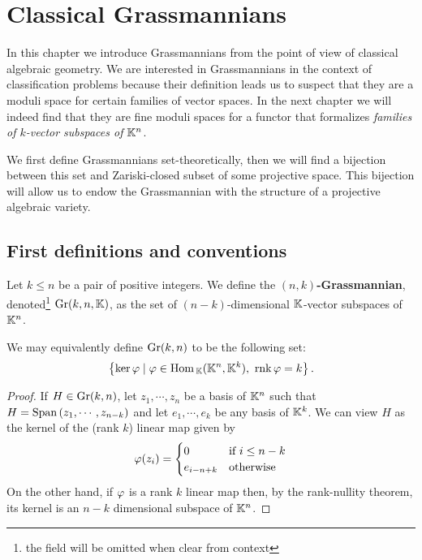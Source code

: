 \chapter{Classical Grassmannians}
In this chapter we introduce Grassmannians from the point of view of classical algebraic geometry. We are interested in Grassmannians in the context of classification problems because their definition leads us to suspect that they are a moduli space for certain families of vector spaces. In the next chapter we will indeed find that they are fine moduli spaces for a functor that formalizes \textit{families of $k$-vector subspaces of $\mathbb{K}^n$}.\medskip

We first define Grassmannians set-theoretically, then we will find a bijection between this set and Zariski-closed subset of some projective space. This bijection will allow us to endow the Grassmannian with the structure of a projective algebraic variety.

\section{First definitions and conventions}
\begin{definition}[Grassmannian]
Let $k\leq n$ be a pair of positive integers. We define the \textbf{$(n,k)$-Grassmannian}, denoted\footnote{the field will be omitted when clear from context} $\mathrm{Gr}(k,n,\mathbb{K})$, as the set of $(n-k)$-dimensional $\mathbb{K}$-vector subspaces of $\mathbb{K}^n$.
\end{definition}

\begin{remark}
We may equivalently define $\mathrm{Gr}(k,n)$ to be the following set:
\[\cpa{\ker \vp\mid \vp\in \Hom_\K(\K^n,\K^k),\ \rnk \vp=k}.\]
\end{remark}
\begin{proof}
If $H\in \mathrm{Gr}(k,n)$, let $z_1,\cdots, z_n$ be a basis of $\mathbb{K}^n$ such that $H=\mathrm{Span}\,(z_1,\cdots, z_{n-k})$ and let $e_1,\cdots, e_k$ be any basis of $\mathbb{K}^k$. We can view $H$ as the kernel of the (rank $k$) linear map given by
\[\varphi(z_i)=\begin{cases}
0 &\text{if }i\leq n-k\\
e_{i-n+k} &\text{otherwise}
\end{cases}\]
On the other hand, if $\varphi$ is a rank $k$ linear map then, by the rank-nullity theorem, its kernel is an $n-k$ dimensional subspace of $\mathbb{K}^n$.
\end{proof}

